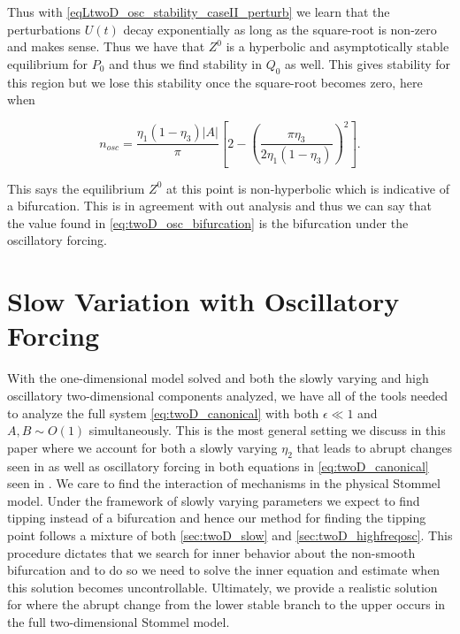 Thus with \eqref{eqLtwoD_osc_stability_caseII_perturb} we learn that the perturbations $U(t)$ decay exponentially as long as the square-root is non-zero and makes sense. Thus we have that $Z^0$ is a hyperbolic and asymptotically stable equilibrium for $P_0$ and thus we find stability in $Q_0$ as well. This gives stability for this region but we lose this stability once the square-root becomes zero, here when

\begin{equation*}
n_{osc} = \frac{\eta_1(1-\eta_3)|A|}{\pi}\left[2-\left(\frac{\pi\eta_3}{2\eta_1(1-\eta_3)}\right)^2\right].
\end{equation*}

This says the equilibrium $Z^0$ at this point is non-hyperbolic which is indicative of a bifurcation. This is in agreement with out analysis and thus we can say that the value found in \eqref{eq:twoD_osc_bifurcation} is the bifurcation under the oscillatory forcing.


\section{Slow Variation with Oscillatory Forcing}
\label{sec:twoD_slowosc}

With the one-dimensional model solved and both the slowly varying and high oscillatory two-dimensional components analyzed, we have all of the tools needed to analyze the full system \eqref{eq:twoD_canonical} with both $\epsilon \ll 1$ and $A,B\sim O(1)$ simultaneously. This is the most general setting we discuss in this paper where we account for both a slowly varying $\eta_2$ that leads to abrupt changes seen in \cite{alley2003abrupt,marotzke2000abrupt,rahmstorf2000thermohaline} as well as oscillatory forcing in both equations in \eqref{eq:twoD_canonical} seen in \cite{roberts2017relaxation,huybers2005obliquity}. We care to find the interaction of mechanisms in the physical Stommel model. Under the framework of slowly varying parameters we expect to find tipping instead of a bifurcation and hence our method for finding the tipping point follows a mixture of both \autoref{sec:twoD_slow} and \autoref{sec:twoD_highfreqosc}. This procedure dictates that we search for inner behavior about the non-smooth bifurcation and to do so we need to solve the inner equation and estimate when this solution becomes uncontrollable. Ultimately, we provide a realistic solution for where the abrupt change from the lower stable branch to the upper occurs in the full two-dimensional Stommel model.

